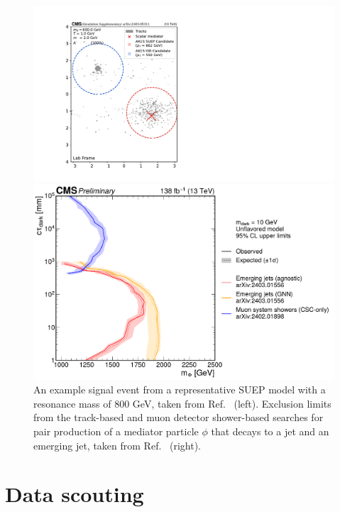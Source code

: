 \documentclass{moriond}
\begin{document}
\begin{figure}
\begin{minipage}{0.33\linewidth}
\centerline{\includegraphics[width=1.0\linewidth]{CMS-EXO-23-002_Figure-aux_005.pdf}}
\end{minipage}
\hfill
\begin{minipage}{0.65\linewidth}
\centerline{\includegraphics[width=1.0\linewidth]{emj_EXO-22-015_EXO-21-008_limits_unflavored_prelim.pdf}}
\end{minipage}
\caption[]{An example signal event from a representative SUEP model
  with a resonance mass of 800 GeV, taken from Ref.~\cite{CMS:2024nca} (left). Exclusion limits from the
  track-based and muon detector shower-based searches for pair
  production of a mediator particle $\phi$ that decays to a jet and an
  emerging jet, taken from Ref.~\cite{CMS:2024gxp} (right).}
\label{fig:darksector}
\end{figure}

\section{Data scouting}
\end{document}
